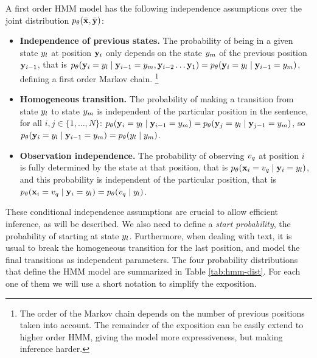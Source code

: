A first order HMM model has the following independence assumptions over the joint distribution $p_{\theta}(\bar{\mathbf{x}} ,\bar{\mathbf{y}})$:
\begin{itemize}
  \item \textbf{Independence of previous states.} The probability of
    being in a given state ${y}_l$ at position $\mathbf{y}_i$ only depends on
    the state ${y}_m$ of the previous position $\mathbf{y}_{i-1}$, that is 
    $p_{\theta} (\mathbf{y}_i = {y}_l \mid \mathbf{y}_{i-1} = {y}_m, \mathbf{y}_{i-2} \ldots \mathbf{y}_{1}) = p_{\theta} (\mathbf{y}_i = {y}_l \mid \mathbf{y}_{i-1} = {y}_m)$, 
    defining a first order Markov chain.%
    \footnote{The order of the Markov chain depends on the number of previous positions taken into account. 
    The remainder of the exposition can be easily extend to higher order HMM, giving the model more expressiveness, 
    but making inference harder.}
  \item \textbf{Homogeneous transition.} The probability of
    making a transition from state ${y}_l$ to state ${y}_m$ is independent of
    the particular position in the sentence, for all $i,j \in \{1,\ldots,N\}$:
    $p_{\theta} (\mathbf{y}_i = {y}_l \mid \mathbf{y}_{i-1} = {y}_m) =  p_{\theta}
    (\mathbf{y}_j = {y}_l \mid \mathbf{y}_{j-1} = {y}_m)$, so
    $p_{\theta} (\mathbf{y}_i = {y}_l \mid \mathbf{y}_{i-1} = {y}_m) = p_{\theta} ({y}_l \mid {y}_m)$.
  \item \textbf{Observation independence.}  The probability of
    observing ${v}_q$ at position $i$ is fully determined by the state
    at that position, that is  $p_{\theta}(\mathbf{x}_i = {v}_q\mid
    \mathbf{y}_i={y}_l)$, and this probability is independent of the
    particular position, that is  $p_{\theta}(\mathbf{x}_i = {v}_q\mid
    \mathbf{y}_i={y}_l)  = p_{\theta}({v}_q\mid {y}_l)$.
\end{itemize}
These conditional independence assumptions are crucial to allow
efficient inference, as will be described. We also need to define a \emph{start probability}, the probability of starting 
at state ${y}_l$. Furthermore, when
dealing with text, it is usual to break the homogeneous transition
for the last position, and model the final transitions as 
independent parameters.
 The four probability
distributions that define the HMM model are summarized in Table
\ref{tab:hmm-dist}. 
For each one
of them we will use a short notation to simplify the exposition.
